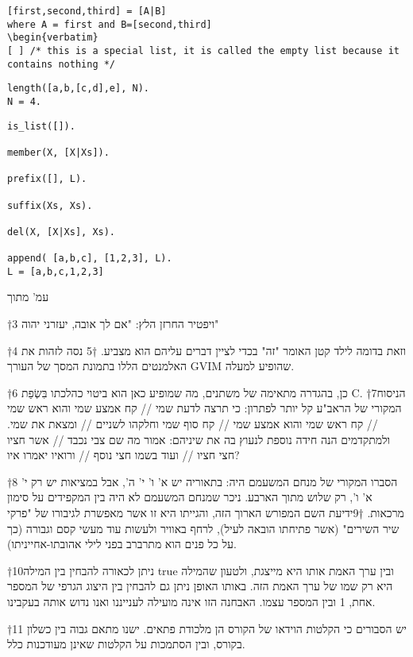 \begin{verbatim}
[first,second,third] = [A|B]
where A = first and B=[second,third]
\begin{verbatim}
[ ] /* this is a special list, it is called the empty list because it contains nothing */
\end{verbatim}

\begin{verbatim}
length([a,b,[c,d],e], N).
N = 4.
\end{verbatim}

\begin{verbatim}
is_list([]).

member(X, [X|Xs]).

prefix([], L).

suffix(Xs, Xs).

del(X, [X|Xs], Xs).

append( [a,b,c], [1,2,3], L).
L = [a,b,c,1,2,3]
\end{verbatim}

        עמ’ מתוך

†{3} ויפטיר החרזן הלץ: "אם לך אובה, יעזרני יהוה"

†{4} וזאת בדומה לילד קטן האומר "זה" בכדי לציין דברים עליהם הוא מצביע.
†{5} נסה לזהות את האלמנטים הללו בתמונת המסך של העורך GVIM שהופיע למעלה.

†{6} כן, בהגדרה מתאימה של משתנים, מה שמופיע כאן הוא ביטוי כהלכתו בִּשְׂפַת C.
†{7}הניסוח המקורי של הראב"ע קל יותר לפתרון: כי תרצה לדעת שמי // קח אמצע שמי והוא ראש שמי // קח ראש שמי והוא אמצע שמי // קח סוף שמי וחלקהו לשניים // ומצאת את שמי. ולמתקדמים הנה חידה נוספת לנעוץ בה את שיניהם: אמור מה שם צבי נכבד // אשר חציו חצי חציו // ועוד בשמו חצי נוסף // ורואיו יאמרו איו?

†{8} הסברו המקורי של מנחם המשעמם היה: בתאוריה יש א' ו' י' ה', אבל במציאות יש רק י' א' ו', רק שלוש מתוך הארבע. ניכר שמנחם המשעמם לא היה בין המקפידים על סימון מרכאות.
†{9}ידיעת השם המפורש הארוך הזה, והגייתו היא זו אשר מאפשרת לגיבורו של "פרקי שיר השירים" (אשר פתיחתו הובאה לעיל), לרחף באוויר ולעשות עוד מעשי קסם וגבורה (כך על כל פנים הוא מתרברב בפני לילי אהובתו-אחייניתו).

†{10}ניתן לכאורה להבחין בין המילה true ובין ערך האמת אותו היא מייצגת, ולטעון שהמילה היא רק שמו של ערך האמת הזה. באותו האופן ניתן גם להבחין בין היצוג הגרפי של המספר אחת, 1 ובין המספר עצמו. האבחנה הזו אינה מועילה לענייננו ואנו נדוש אותה בעקבינו.

†{11} יש הסבורים כי הקלטות הוידאו של הקורס הן מלכודת פתאים. ישנו מתאם גבוה בין כשלון בקורס, ובין הסתמכות על הקלטות שאינן מעודכנות כלל.

